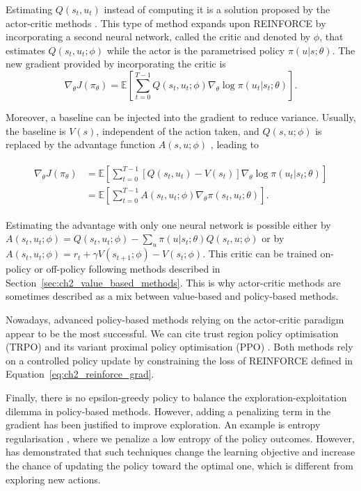Estimating $Q(s_t, u_t)$ instead of computing it is a solution proposed by the actor-critic methods \citep{sutton1999policy,konda1999actor}.
This type of method expands upon REINFORCE by incorporating a second neural network, called the critic and denoted by $\phi$, that estimates $Q(s_t, u_t;\phi)$ while the actor is the parametrised policy $\pi(u|s;\theta)$.
The new gradient provided by incorporating the critic is
\begin{equation}
\label{eq:ch2_Q_actor_crit}
    \nabla_\theta J(\pi_\theta) = \mathbb{E}\left[\sum_{t=0}^{T-1} Q(s_t, u_t;\phi) \nabla_\theta \log \pi(u_t|s_t;\theta)\right].
\end{equation}

Moreover, a baseline can be injected into the gradient to reduce variance.
Usually, the baseline is  $V(s)$, independent of the action taken, and $Q(s, u;\phi)$ is replaced by the advantage function $A(s,u; \phi)$ \citep{10.5555/2074022.2074088}, leading to

\begin{align}
\begin{split}
\label{eq:ch2_baseline_actor_crit}
    \nabla_\theta J(\pi_\theta)
    & = \mathbb{E}\left[\sum_{t=0}^{T-1} [Q(s_t, u_t) - V(s_t)] \nabla_\theta \log \pi(u_t|s_t;\theta)\right]\\
    & = \mathbb{E} \left[\sum_{t=0}^{T-1} A(s_t, u_t; \phi) \nabla_\theta \pi(s_t, u_t; \theta)\right].
\end{split}
\end{align}

Estimating the advantage with only one neural network is possible either by $A(s_t,u_t; \phi)=Q(s_t, u_t;\phi)-\sum_u \pi(u|s_t;\theta) Q(s_t,u; \phi)$ or by $A(s_t,u_t; \phi)=r_t +\gamma V(s_{t+1};\phi) - V(s_t;\phi)$.
This critic can be trained on-policy or off-policy following methods described in Section~\ref{sec:ch2_value_based_methods}.
This is why actor-critic methods are sometimes described as a mix between value-based and policy-based methods.

Nowadays, advanced policy-based methods relying on the actor-critic paradigm appear to be the most successful.
We can cite trust region policy optimisation (TRPO) \citep{schulman2015trust} and its variant proximal policy optimisation (PPO) \citep{schulman2017ppo}.
Both methods rely on a controlled policy update by constraining the loss of REINFORCE defined in Equation~\ref{eq:ch2_reinforce_grad}.

Finally, there is no epsilon-greedy policy to balance the exploration-exploitation dilemma in policy-based methods.
However, adding a penalizing term in the gradient has been justified to improve exploration.
An example is entropy regularisation \citep{williams1991function}, where we penalize a low entropy of the policy outcomes.
However, \cite{bolland2024behind} has demonstrated that such techniques change the learning objective and increase the chance of updating the policy toward the optimal one, which is different from exploring new actions.

